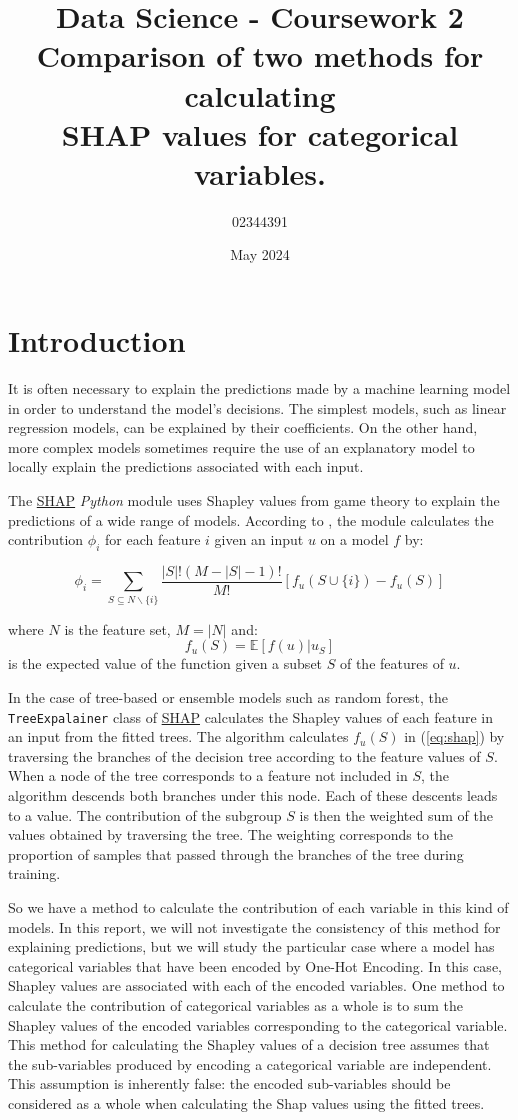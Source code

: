 \documentclass[11pt]{article}
\title{%
  Data Science - Coursework 2 \\
  \large Comparison of two methods for calculating \\ SHAP values for categorical variables.}
\date{May 2024}
\author{02344391}
\begin{document}
\maketitle
\section*{Introduction}
It is often necessary to explain the predictions made by a machine learning model in order to 
understand the model's decisions. The simplest models, such as linear regression models, can 
be explained by their coefficients. On the other hand, more complex models sometimes require 
the use of an explanatory model to locally explain the predictions associated with each input.

The \href{https://github.com/shap/shap}{SHAP} \textit{Python} module uses Shapley values from 
game theory to explain the predictions of a wide range of models.
According to \cite{lundberg2019consistent}, the module calculates the contribution $\phi_i$ for each 
feature $i$ given an input $u$ on a model $f$ by:

\begin{equation}
    \phi_i = \sum_{S \subseteq N \backslash \{i\}}\frac{|S|!(M-|S| - 1)!}{M !}[f_u(S\cup \{i\})-f_u(S)]
    \label{eq:shap}
\end{equation}

where $N$ is the feature set, $M = |N|$ and:
$$f_u(S) = \mathbb{E}[f(u)|u_S]$$
is the expected value of the function given a subset $S$ of the features of $u$.

In the case of tree-based or ensemble models such as random forest, the \texttt{TreeExpalainer}
class of \href{https://github.com/shap/shap}{SHAP} calculates the Shapley values of each feature 
in an input from the fitted trees. The algorithm calculates $f_u(S)$ in (\ref{eq:shap}) by 
traversing the branches of the decision tree according to the feature values of $S$. When a 
node of the tree corresponds to a feature not included in $S$, the algorithm descends both 
branches under this node. Each of these descents leads to a value. The contribution of the subgroup
$S$ is then the weighted sum of the values obtained by traversing the tree. The weighting corresponds 
to the proportion of samples that passed through the branches of the tree during training.

So we have a method to calculate the contribution of each variable in this kind of models. In this report, 
we will not investigate the consistency of this method for explaining predictions, 
but we will study the particular case where a model has categorical variables that have been 
encoded by One-Hot Encoding. In this case, Shapley values are associated with each of the encoded 
variables. One method to calculate the contribution of categorical variables as a whole is to sum 
the Shapley values of the encoded variables corresponding to the categorical variable. This method for 
calculating the Shapley values of a decision tree assumes that the sub-variables produced by encoding a 
categorical variable are independent. This assumption is inherently false: the encoded sub-variables should 
be considered as a whole when calculating the Shap values using the fitted trees.
\end{document}
